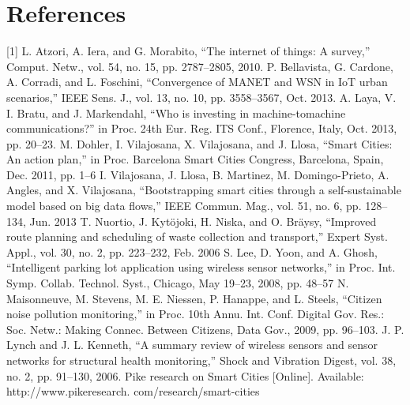 \documentclass[a4paper]{report}
\begin{document}
	\section{References}
	[1] L. Atzori, A. Iera, and G. Morabito, “The internet of things: A survey,”
	Comput. Netw., vol. 54, no. 15, pp. 2787–2805, 2010.
	\newline
	[2] P. Bellavista, G. Cardone, A. Corradi, and L. Foschini, “Convergence of
	MANET and WSN in IoT urban scenarios,” IEEE Sens. J., vol. 13, no. 10,
	pp. 3558–3567, Oct. 2013.
	\newline
	[3] A. Laya, V. I. Bratu, and J. Markendahl, “Who is investing in machine-tomachine communications?” in Proc. 24th Eur. Reg. ITS Conf., Florence,
	Italy, Oct. 2013, pp. 20–23.
	\newline
	[4] M. Dohler, I. Vilajosana, X. Vilajosana, and J. Llosa, “Smart Cities: An
	action plan,” in Proc. Barcelona Smart Cities Congress, Barcelona, Spain,
	Dec. 2011, pp. 1–6
	\newline
	[5]  I. Vilajosana, J. Llosa, B. Martinez, M. Domingo-Prieto, A. Angles, and
	X. Vilajosana, “Bootstrapping smart cities through a self-sustainable model
	based on big data flows,” IEEE Commun. Mag., vol. 51, no. 6, pp. 128–134,
	Jun. 2013
	\newline
	[6] T. Nuortio, J. Kytöjoki, H. Niska, and O. Bräysy, “Improved route planning
	and scheduling of waste collection and transport,” Expert Syst. Appl.,
	vol. 30, no. 2, pp. 223–232, Feb. 2006
	\newline
	[7] S. Lee, D. Yoon, and A. Ghosh, “Intelligent parking lot application using
	wireless sensor networks,” in Proc. Int. Symp. Collab. Technol. Syst.,
	Chicago, May 19–23, 2008, pp. 48–57
	\newline
	[8] N. Maisonneuve, M. Stevens, M. E. Niessen, P. Hanappe, and L. Steels,
	“Citizen noise pollution monitoring,” in Proc. 10th Annu. Int. Conf. Digital
	Gov. Res.: Soc. Netw.: Making Connec. Between Citizens, Data Gov., 2009,
	pp. 96–103.
	\newline
	[9]  J. P. Lynch and J. L. Kenneth, “A summary review of wireless sensors and
	sensor networks for structural health monitoring,” Shock and Vibration
	Digest, vol. 38, no. 2, pp. 91–130, 2006.
	\newline 
	[10] Pike research on Smart Cities [Online]. Available: http://www.pikeresearch.
	com/research/smart-cities
	
\end{document}
